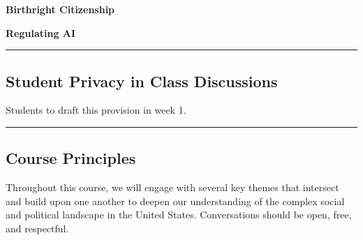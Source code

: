 \documentclass[]{tufte-handout}
\begin{document}
\textbf{Birthright Citizenship}

\textbf{Regulating AI}

\begin{center}\rule{0.5\linewidth}{0.5pt}\end{center}

\hypertarget{student-privacy-in-class-discussions}{%
\subsection{Student Privacy in Class
Discussions}\label{student-privacy-in-class-discussions}}

Students to draft this provision in week 1.

\begin{center}\rule{0.5\linewidth}{0.5pt}\end{center}

\hypertarget{course-principles}{%
\subsection{Course Principles}\label{course-principles}}

Throughout this course, we will engage with several key themes that
intersect and build upon one another to deepen our understanding of the
complex social and political landscape in the United States.
Conversations should be open, free, and respectful.
\end{document}
